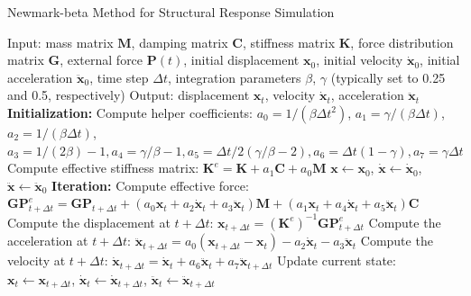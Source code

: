 \documentclass[a4paper,fleqn,numbers,sort&compress]{cas-sc}
\begin{document}
\begin{algorithm}[H]
    \caption{Newmark-beta Method for Structural Response Simulation \citep{newmark_methodcomputationstructural_1959}}
    \label{alg:newmark-beta}
    \begin{algorithmic}[1]
    \STATE Input: mass matrix $\mathbf{M}$, 
    damping matrix $\mathbf{C}$, 
    stiffness matrix $\mathbf{K}$, 
    force distribution matrix $\mathbf{G}$, 
    external force $\mathbf{P}(t)$, 
    initial displacement $\mathbf{x}_0$, 
    initial velocity $\dot{\mathbf{x}}_0$, 
    initial acceleration $\ddot{\mathbf{x}}_0$, 
    time step $\Delta t$, 
    integration parameters $\beta$, $\gamma$ (typically set to 0.25 and 0.5, respectively)
    \STATE Output: displacement $\mathbf{x}_t$, velocity $\dot{\mathbf{x}}_t$, acceleration $\ddot{\mathbf{x}}_t$
    \STATE \textbf{Initialization:}
    \STATE Compute helper coefficients: $a_0 = 1 / (\beta \Delta t^2)$, $a_1 = \gamma / (\beta \Delta t)$, $a_2 = 1 / (\beta \Delta t)$, $a_3 = 1 / (2 \beta) - 1, a_4 = \gamma / \beta - 1, a_5 = \Delta t / 2(\gamma / \beta - 2), a_6 = \Delta t (1 - \gamma), a_7 = \gamma \Delta t$
    \STATE Compute effective stiffness matrix: $ \mathbf{K}^e = \mathbf{K} + a_1 \mathbf{C} + a_0 \mathbf{M} $
    \STATE $\mathbf{x} \gets \mathbf{x}_0$, $\dot{\mathbf{x}} \gets \dot{\mathbf{x}}_0$, $\ddot{\mathbf{x}} \gets \ddot{\mathbf{x}}_0$
    \STATE \textbf{Iteration:}
        \STATE Compute effective force: $\mathbf{G} \mathbf{P}_{t+\Delta t}^e = \mathbf{G} \mathbf{P}_{t+\Delta t} + (a_0 \mathbf{x}_t + a_2 \dot{\mathbf{x}}_t + a_3 \ddot{\mathbf{x}}_t) \mathbf{M} + (a_1 \mathbf{x}_t + a_4 \dot{\mathbf{x}}_t + a_5 \ddot{\mathbf{x}}_t) \mathbf{C}$
        \STATE Compute the displacement at $t+\Delta t$: $\mathbf{x}_{t+\Delta t} = (\mathbf{K}^{e})^{-1} \mathbf{G} \mathbf{P}_{t+\Delta t}^e$
        \STATE Compute the acceleration at $t+\Delta t$: $\ddot{\mathbf{x}}_{t+\Delta t} = a_0 (\mathbf{x}_{t+\Delta t} - \mathbf{x}_t) - a_2 \dot{\mathbf{x}}_t - a_3 \ddot{\mathbf{x}}_t$
        \STATE Compute the velocity at $t+\Delta t$: $\dot{\mathbf{x}}_{t+\Delta t} = \dot{\mathbf{x}}_t + a_6 \ddot{\mathbf{x}}_t + a_7 \ddot{\mathbf{x}}_{t+\Delta t}$
        \STATE Update current state: $\mathbf{x}_t \gets \mathbf{x}_{t+\Delta t}$, $\dot{\mathbf{x}}_t \gets \dot{\mathbf{x}}_{t+\Delta t}$, $\ddot{\mathbf{x}}_t \gets \ddot{\mathbf{x}}_{t+\Delta t}$
    \ENDFOR
    \end{algorithmic}
\end{algorithm}
\end{document}
